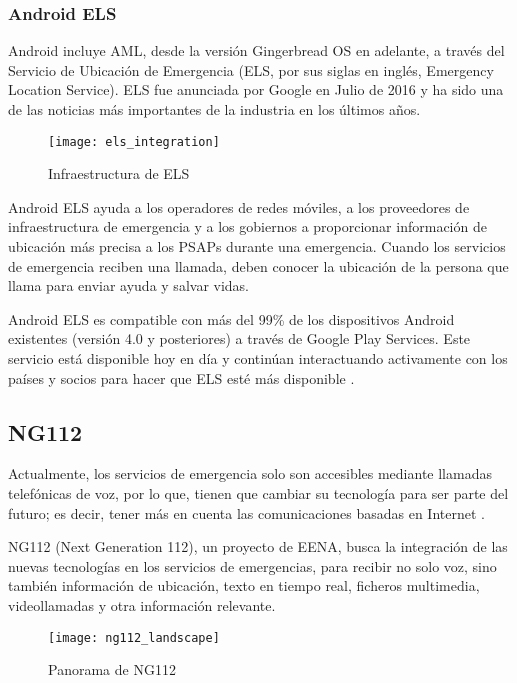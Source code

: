 \subsubsection{Android ELS}

Android incluye AML, desde la versión Gingerbread OS en adelante, a través del Servicio de Ubicación de Emergencia (ELS, por sus siglas en inglés, Emergency Location Service). ELS fue anunciada por Google en Julio de 2016 y ha sido una de las noticias más importantes de la industria en los últimos años.

\begin{figure}[htp!]
  \centering
  \texttt{[image: els\_integration]}
  \caption{Infraestructura de ELS}
  \label{fig:els_integration}
\end{figure}

Android ELS ayuda a los operadores de redes móviles, a los proveedores de infraestructura de emergencia y a los gobiernos a proporcionar información de ubicación más precisa a los PSAPs durante una emergencia. Cuando los servicios de emergencia reciben una llamada, deben conocer la ubicación de la persona que llama para enviar ayuda y salvar vidas.

Android ELS es compatible con más del 99\% de los dispositivos Android existentes (versión 4.0 y posteriores) a través de Google Play Services. Este servicio está disponible hoy en día y continúan interactuando activamente con los países y socios para hacer que ELS esté más disponible \cite{els1}.

\subsection{NG112}

Actualmente, los servicios de emergencia solo son accesibles mediante llamadas telefónicas de voz, por lo que, tienen que cambiar su tecnología para ser parte del futuro; es decir, tener más en cuenta las comunicaciones basadas en Internet \cite{ng3}.

NG112 (Next Generation 112), un proyecto de EENA, busca la integración de las nuevas tecnologías en los servicios de emergencias, para recibir no solo voz, sino también información de ubicación, texto en tiempo real, ficheros multimedia, videollamadas y otra información relevante.

\begin{figure}[htp!]
  \centering
  \texttt{[image: ng112\_landscape]}
  \caption{Panorama de NG112}
  \label{fig:ng112_landscape}
\end{figure}

